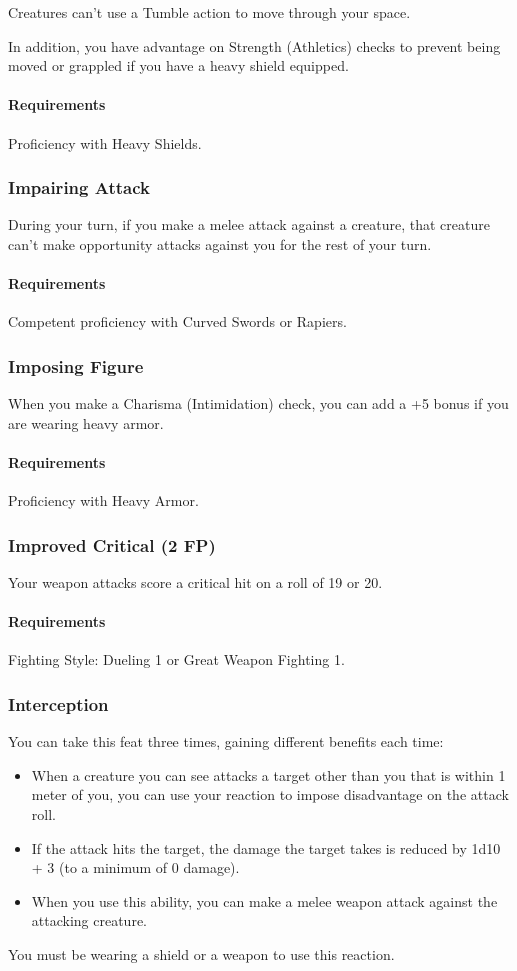     Creatures can't use a Tumble action to move through your space.

    In addition, you have advantage on Strength (Athletics) checks to prevent being moved or grappled if you have a heavy shield equipped.
    \paragraph{Requirements} Proficiency with Heavy Shields.
\subsubsection{Impairing Attack} \label{feat::impairingattack}
    During your turn, if you make a melee attack against a creature, that creature can't make opportunity attacks against you for the rest of your turn.
    \paragraph{Requirements} Competent proficiency with Curved Swords or Rapiers.
\subsubsection{Imposing Figure} \label{feat::imposingfigure}
    When you make a Charisma (Intimidation) check, you can add a +5 bonus if you are wearing heavy armor.
    \paragraph{Requirements} Proficiency with Heavy Armor.
\subsubsection{Improved Critical (2 FP)} \label{feat::improvedcritical}
    Your weapon attacks score a critical hit on a roll of 19 or 20.
    \paragraph{Requirements} Fighting Style: Dueling 1 or Great Weapon Fighting 1.
\subsubsection{Interception} \label{feat::interception}
    You can take this feat three times, gaining different benefits each time:
    \begin{itemize}
        \item When a creature you can see attacks a target other than you that is within 1 meter of you, you can use your reaction to impose disadvantage on the attack roll.
        \item If the attack hits the target, the damage the target takes is reduced by 1d10 + 3 (to a minimum of 0 damage).
        \item When you use this ability, you can make a melee weapon attack against the attacking creature.
    \end{itemize}
    You must be wearing a shield or a weapon to use this reaction.
